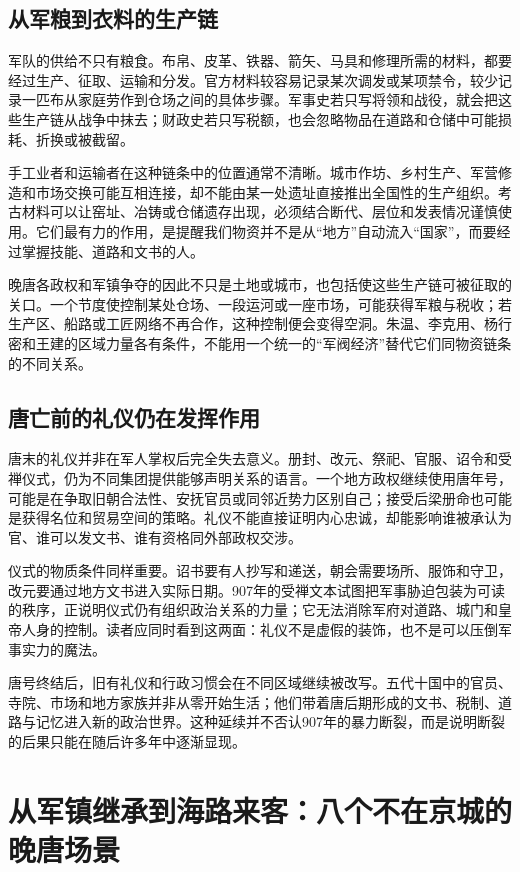 \subsection{从军粮到衣料的生产链}
军队的供给不只有粮食。布帛、皮革、铁器、箭矢、马具和修理所需的材料，都要经过生产、征取、运输和分发。官方材料较容易记录某次调发或某项禁令，较少记录一匹布从家庭劳作到仓场之间的具体步骤。军事史若只写将领和战役，就会把这些生产链从战争中抹去；财政史若只写税额，也会忽略物品在道路和仓储中可能损耗、折换或被截留。

手工业者和运输者在这种链条中的位置通常不清晰。城市作坊、乡村生产、军营修造和市场交换可能互相连接，却不能由某一处遗址直接推出全国性的生产组织。考古材料可以让窑址、冶铸或仓储遗存出现，必须结合断代、层位和发表情况谨慎使用。它们最有力的作用，是提醒我们物资并不是从“地方”自动流入“国家”，而要经过掌握技能、道路和文书的人。

晚唐各政权和军镇争夺的因此不只是土地或城市，也包括使这些生产链可被征取的关口。一个节度使控制某处仓场、一段运河或一座市场，可能获得军粮与税收；若生产区、船路或工匠网络不再合作，这种控制便会变得空洞。朱温、李克用、杨行密和王建的区域力量各有条件，不能用一个统一的“军阀经济”替代它们同物资链条的不同关系。

\subsection{唐亡前的礼仪仍在发挥作用}
唐末的礼仪并非在军人掌权后完全失去意义。册封、改元、祭祀、官服、诏令和受禅仪式，仍为不同集团提供能够声明关系的语言。一个地方政权继续使用唐年号，可能是在争取旧朝合法性、安抚官员或同邻近势力区别自己；接受后梁册命也可能是获得名位和贸易空间的策略。礼仪不能直接证明内心忠诚，却能影响谁被承认为官、谁可以发文书、谁有资格同外部政权交涉。

仪式的物质条件同样重要。诏书要有人抄写和递送，朝会需要场所、服饰和守卫，改元要通过地方文书进入实际日期。907年的受禅文本试图把军事胁迫包装为可读的秩序，正说明仪式仍有组织政治关系的力量；它无法消除军府对道路、城门和皇帝人身的控制。读者应同时看到这两面：礼仪不是虚假的装饰，也不是可以压倒军事实力的魔法。

唐号终结后，旧有礼仪和行政习惯会在不同区域继续被改写。五代十国中的官员、寺院、市场和地方家族并非从零开始生活；他们带着唐后期形成的文书、税制、道路与记忆进入新的政治世界。这种延续并不否认907年的暴力断裂，而是说明断裂的后果只能在随后许多年中逐渐显现。

\section{从军镇继承到海路来客：八个不在京城的晚唐场景}

